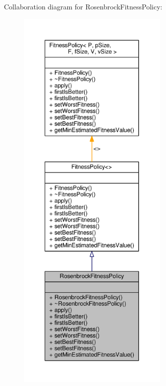 Collaboration diagram for Rosenbrock\+Fitness\+Policy\+:\nopagebreak
\begin{figure}[H]
\begin{center}
\leavevmode
\includegraphics[height=550pt]{classRosenbrockFitnessPolicy__coll__graph}
\end{center}
\end{figure}
